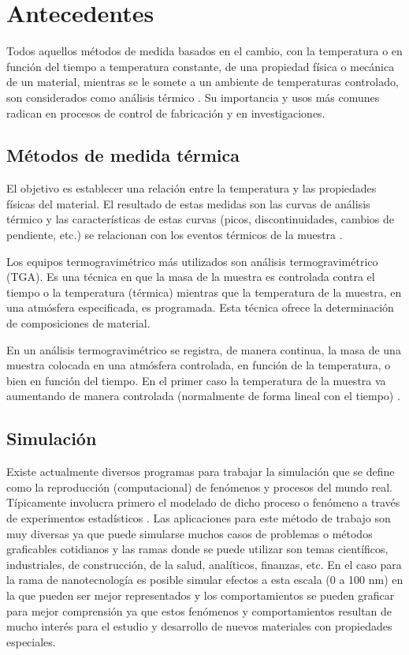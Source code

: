 \documentclass[3pt,twocolumn]{elsarticle}
\begin{document}
\section{Antecedentes}\label{antesc}
Todos aquellos métodos de medida basados en el cambio, con la temperatura o en función del tiempo a temperatura constante, de una propiedad física o mecánica de un material, mientras se le somete a un ambiente de temperaturas controlado, son considerados como análisis térmico \cite{book1}. 
Su importancia y usos más comunes radican en procesos de control de fabricación y en investigaciones.
\subsection{Métodos de medida térmica}
 El objetivo es establecer una relación entre la temperatura y las propiedades físicas del material. El resultado de estas medidas son las curvas de análisis térmico y las características de estas curvas (picos, discontinuidades, cambios de pendiente, etc.) se relacionan con los eventos térmicos de la muestra \cite{TGA}.

Los equipos termogravimétrico más utilizados son análisis termogravimétrico (TGA). Es una técnica en que la masa de la muestra es controlada contra el tiempo o la temperatura (térmica) mientras que la temperatura de la muestra, en una atmósfera especificada, es programada. Esta técnica ofrece la determinación de composiciones de material. 

En un análisis termogravimétrico se registra, de manera continua, la masa de una muestra colocada en una atmósfera controlada, en función de la temperatura, o bien en función del tiempo. En el primer caso la temperatura de la muestra va aumentando de manera controlada (normalmente de forma lineal con el tiempo) \cite{book1}.

\subsection{Simulación}
Existe actualmente diversos programas para trabajar la simulación que se define como la reproducción (computacional) de fenómenos y procesos del mundo real. Típicamente involucra primero el modelado de dicho proceso o fenómeno a través de experimentos estadísticos \cite{dra}. Las aplicaciones para este método de trabajo son muy diversas ya que puede simularse muchos casos de problemas o métodos graficables cotidianos y las ramas donde se puede utilizar son temas científicos, industriales, de construcción, de la salud, analíticos, finanzas, etc. En el caso para la rama de nanotecnología es posible simular efectos a esta escala (0 a 100 nm) en la que pueden ser mejor representados y los comportamientos se pueden graficar para mejor comprensión ya que estos fenómenos y comportamientos resultan de mucho interés para el estudio y desarrollo de nuevos materiales con propiedades especiales.
\end{document}
